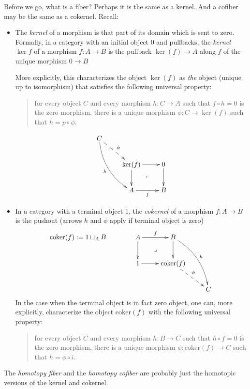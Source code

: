 Before we go, what is a fiber? Perhaps it is
the same as a kernel. And a cofiber may be
the same as a cokernel. Recall:
\begin{definition}
\label{definition-kernel-and-cokernel}
	\begin{itemize}
		\item The {\it kernel} of a morphism is
		that part of its domain which is sent to
		zero. Formally, in a category with an
		initial object 0 and pullbacks, the {\it
		kernel $\ker f$} of a morphism $f:A\to B$
		is the pullback $\ker(f)\to A$ along $f$ of
		the unique morphism $0\to B$

		More explicitly, this characterizes the
		object $\ker(f)$ as \textit{the} object
		(unique up to isomorphism) that satisfies
		the following universal property:
		\begin{quote}
			for every object $C$ and every morphism
			$h:C\to A$ such that $f\circ h=0$ is the
			zero morphism, there is a unique morphism
			$\phi:C\to\ker(f)$ such that
			$h=p\circ\phi$.
		\end{quote}
		$$
		\xymatrix{
			C\ar@{-->}[dr]^{\phi}\ar@/_1pc/[ddr]_{h}\\
			&\ker(f)\ar[d]\ar[r]&0\ar[d]\\
			&A\ar[r]_{f}&B\ar@{}[ul]|{\ulcorner}
		}
		$$
		\item In a category with a terminal object
		1, the {\it cokernel} of a morphism $f:A\to
		B$ is the pushout (arrows $h$ and $\phi$
		apply if terminal object is zero)
		$$
		\text{coker}(f):=1\sqcup_AB
		\qquad\qquad
		\xymatrix{
			A\ar[r]^{f}\ar[d]\ar@{}[dr]|{\lrcorner}
			&B\ar[d]\ar@/^1pc/[rdd]^{h}\\
			1\ar[r]&\text{coker}(f)\ar@{-->}[dr]
			^{\phi}\\
			&&C
		}
		$$
		In the case when the terminal object is in
		fact zero object, one can, more explicitly,
		characterize the object $\text{coker}(f)$
		with the following universal property:
		\begin{quote}
			for every object $C$ and every morphism
			$h:B\to C$ such that $h\circ f=0$ is the
			zero morphism, there is a unique morphism
			$\phi:\text{coker}(f)\to C$ such that
			$h=\phi\circ i$.
		\end{quote}
\end{itemize}
\end{definition}
The {\it homotopy fiber} and the  {\it
homotopy cofiber} are probably just the
homotopic versions of the kernel and
cokernel.

